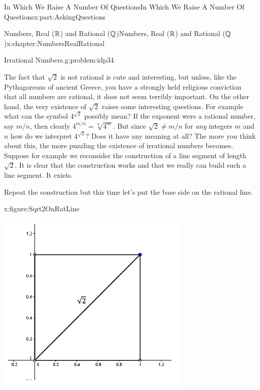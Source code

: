 \begin{partptx}{In Which We Raise A Number Of Questions}{}{In Which We Raise A Number Of Questions}{}{}{x:part:AskingQuestions}
\begin{chapterptx}{Numbers, Real (\(\mathbb {R}\)) and Rational (\(\mathbb {Q}\))}{}{Numbers, Real (\(\mathbb {R}\)) and Rational (\(\mathbb {Q}\))}{}{}{x:chapter:NumbersRealRational}
\begin{introduction}{}
\begin{problem}{Irrational Numbers.}{g:problem:idp34}
\begin{enumerate}[font=\bfseries,label=(\alph*),ref=\alph*]
				\end{enumerate}
			\end{problem}
			 The fact that \(\sqrt{2}\) is not rational is cute and interesting, but unless, like the Pythagoreans of ancient Greece, you have a strongly held religious conviction that all numbers are rational, it does not seem terribly important. On the other hand, the very existence of \(\sqrt{2}\) raises some interesting questions. For example what can the symbol \(4^{\sqrt{2}}\) possibly mean? If the exponent were a rational number, say \(m/n\), then clearly \(4^{m/n}=\sqrt[n]{4^m}\). But since \(\sqrt{2}\neq m/n\) for \emph{any} integers \(m\) and \(n\) how do we interpret \(4^{\sqrt{2}}?\) Does it have any meaning at all? The more you think about this, the more puzzling the existence of irrational numbers becomes. Suppose for example we reconsider the construction of a line segment of length \(\sqrt{2}\). It is clear that the construction works and that we really can build such a line segment. It exists.%
			\par
			Repeat the construction but this time let's put the base side on the rational line.%
			\begin{figureptx}{}{x:figure:Sqrt2OnRatLine}{}%
				\begin{image}{0.25}{0.5}{0.25}%
					\includegraphics[width=\linewidth]{external/images/Sqrt2OnRatLine.png}
				\end{image}%

\end{figureptx}
\end{introduction}
\end{chapterptx}
\end{partptx}
